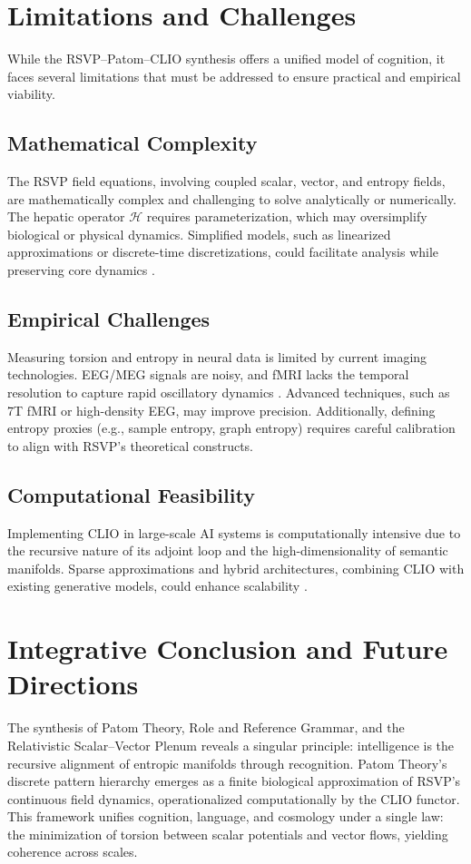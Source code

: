 \documentclass[11pt]{article}
\begin{document}
\section{Limitations and Challenges}
\label{sec:limitations}
While the RSVP--Patom--CLIO synthesis offers a unified model of cognition, it faces several limitations that must be addressed to ensure practical and empirical viability.

\subsection{Mathematical Complexity}
The RSVP field equations, involving coupled scalar, vector, and entropy fields, are mathematically complex and challenging to solve analytically or numerically. The hepatic operator $\mathcal{H}$ requires parameterization, which may oversimplify biological or physical dynamics. Simplified models, such as linearized approximations or discrete-time discretizations, could facilitate analysis while preserving core dynamics \citep{cheng2025clio}.

\subsection{Empirical Challenges}
Measuring torsion and entropy in neural data is limited by current imaging technologies. EEG/MEG signals are noisy, and fMRI lacks the temporal resolution to capture rapid oscillatory dynamics \citep{alivisatos2012brain}. Advanced techniques, such as 7T fMRI or high-density EEG, may improve precision. Additionally, defining entropy proxies (e.g., sample entropy, graph entropy) requires careful calibration to align with RSVP’s theoretical constructs.

\subsection{Computational Feasibility}
Implementing CLIO in large-scale AI systems is computationally intensive due to the recursive nature of its adjoint loop and the high-dimensionality of semantic manifolds. Sparse approximations and hybrid architectures, combining CLIO with existing generative models, could enhance scalability \citep{ball2019superglue}. 

\section{Integrative Conclusion and Future Directions}
The synthesis of Patom Theory, Role and Reference Grammar, and the Relativistic Scalar--Vector Plenum reveals a singular principle: intelligence is the recursive alignment of entropic manifolds through recognition. Patom Theory’s discrete pattern hierarchy emerges as a finite biological approximation of RSVP’s continuous field dynamics, operationalized computationally by the CLIO functor. This framework unifies cognition, language, and cosmology under a single law: the minimization of torsion between scalar potentials and vector flows, yielding coherence across scales.
\end{document}
